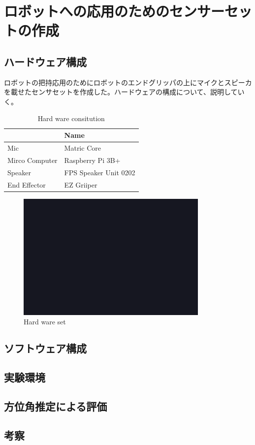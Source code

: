 \section{ロボットへの応用のためのセンサーセットの作成}
\label{chap:app_hand}

\subsection{ハードウェア構成}
\label{sec:hard_content}
ロボットの把持応用のためにロボットのエンドグリッパの上にマイクとスピーカを載せたセンサセットを作成した。ハードウェアの構成について、説明していく。

\begin{table}[b]
    \centering
    \caption{Hard ware consitution}
    \vspace{1zh}
    \begin{tabular}{l||l} \hline
         & Name \\ \hline\hline
        Mic & Matric Core \\
        Mirco Computer & Raspberry Pi 3B+ \\
        Speaker & FPS Speaker Unit 0202 \\
        End Effector & EZ Griiper \\ \hline
    \end{tabular}
    \label{tab:hand_hard_content}
\end{table}

\begin{figure}[b]
  \begin{center}
  \vspace{1zh}
    \includegraphics[width=0.5\linewidth]{images/fig_sample.png}   
  \end{center}
  \caption{Hard ware set}
  \label{fig:hand_hard_image}
\end{figure}

\clearpage

\subsection{ソフトウェア構成}
\label{sec:soft_system}


\subsection{実験環境}
\label{sec:hand_exp_env}

\subsection{方位角推定による評価}
\label{sec:hand_result}

\subsection{考察}
\label{sec:hand_disscusion}

\newpage